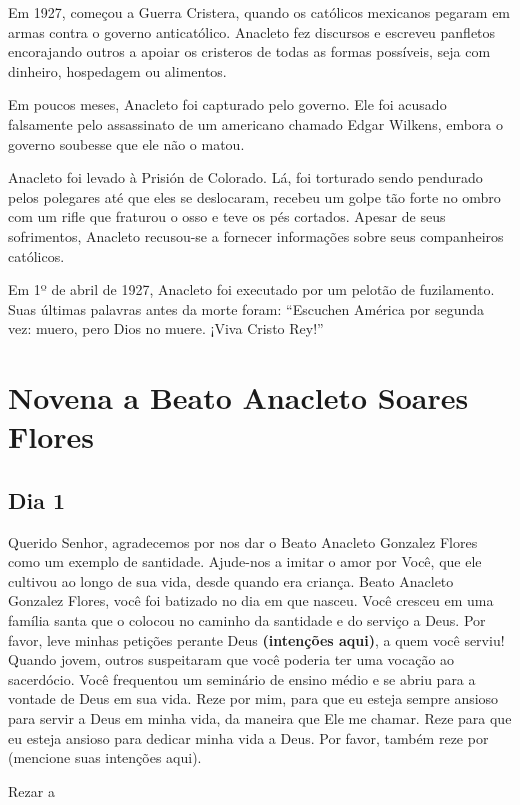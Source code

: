 \documentclass[a4paper,14pt,twoside]{extarticle} \usepackage[utf8]{inputenc}
\begin{document}
Em 1927, começou a Guerra Cristera, quando os católicos mexicanos pegaram em armas contra o governo anticatólico. Anacleto fez discursos e escreveu panfletos encorajando outros a apoiar os cristeros de todas as formas possíveis, seja com dinheiro, hospedagem ou alimentos.

Em poucos meses, Anacleto foi capturado pelo governo. Ele foi acusado falsamente pelo assassinato de um americano chamado Edgar Wilkens, embora o governo soubesse que ele não o matou.

Anacleto foi levado à Prisión de Colorado. Lá, foi torturado sendo pendurado pelos polegares até que eles se deslocaram, recebeu um golpe tão forte no ombro com um rifle que fraturou o osso e teve os pés cortados. Apesar de seus sofrimentos, Anacleto recusou-se a fornecer informações sobre seus companheiros católicos.

Em 1º de abril de 1927, Anacleto foi executado por um pelotão de fuzilamento. Suas últimas palavras antes da morte foram: “Escuchen América por segunda vez: muero, pero Dios no muere. ¡Viva Cristo Rey!”

\newpage


\section{Novena a Beato Anacleto Soares Flores}

\subsection{Dia 1}

Querido Senhor, agradecemos por nos dar o Beato Anacleto Gonzalez Flores como um exemplo de santidade. Ajude-nos a imitar o amor por Você, que ele cultivou ao longo de sua vida, desde quando era criança. Beato Anacleto Gonzalez Flores, você foi batizado no dia em que nasceu. Você cresceu em uma família santa que o colocou no caminho da santidade e do serviço a Deus. Por favor, leve minhas petições perante Deus \textbf{(intenções aqui)}, a quem você serviu! Quando jovem, outros suspeitaram que você poderia ter uma vocação ao sacerdócio. Você frequentou um seminário de ensino médio e se abriu para a vontade de Deus em sua vida. Reze por mim, para que eu esteja sempre ansioso para servir a Deus em minha vida, da maneira que Ele me chamar. Reze para que eu esteja ansioso para dedicar minha vida a Deus. Por favor, também reze por (mencione suas intenções aqui). 

Rezar a \textbf{}
\end{document}

